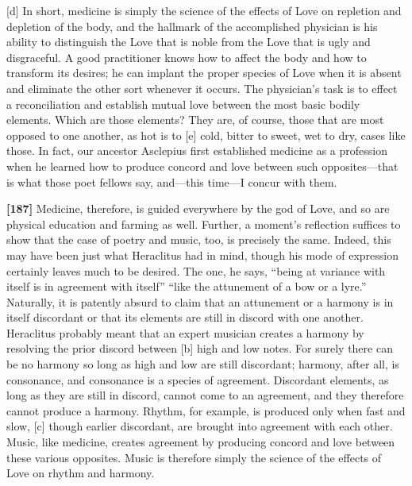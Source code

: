 {[}d{]} In short, medicine is simply the science of the effects of Love
on repletion and depletion of the body, and the hallmark of the
accomplished physician is his ability to distinguish the Love that is
noble from the Love that is ugly and disgraceful. A good practitioner
knows how to affect the body and how to transform its desires; he can
implant the proper species of Love when it is absent and eliminate the
other sort whenever it occurs. The physician's task is to effect a
reconciliation and establish mutual love between the most basic bodily
elements. Which are those elements? They are, of course, those that are
most opposed to one another, as hot is to {[}e{]} cold, bitter to sweet,
wet to dry, cases like those. In fact, our ancestor Asclepius first
established medicine as a profession when he learned how to produce
concord and love between such opposites---that is what those poet
fellows say, and---this time---I concur with them.

{\bf {[}187{]}} Medicine, therefore, is guided everywhere by the god of
Love, and so are physical education and farming as well. Further, a
moment's reflection suffices to show that the case of poetry and music,
too, is precisely the same. Indeed, this may have been just what
Heraclitus had in mind, though his mode of expression certainly leaves
much to be desired. The one, he says, “being at variance with itself is
in agreement with itself” “like the attunement of a bow or a
lyre.” Naturally, it
is patently absurd to claim that an attunement or a harmony is in itself
discordant or that its elements are still in discord with one another.
Heraclitus probably meant that an expert musician creates a harmony by
resolving the prior discord between {[}b{]} high and low notes. For
surely there can be no harmony so long as high and low are still
discordant; harmony, after all, is consonance, and consonance is a
species of agreement. Discordant elements, as long as they are still in
discord, cannot come to an agreement, and they therefore cannot produce
a harmony. Rhythm, for example, is produced only when fast and slow,
{[}c{]} though earlier discordant, are brought into agreement with each
other. Music, like medicine, creates agreement by producing concord and
love between these various opposites. Music is therefore simply the
science of the effects of Love on rhythm and harmony.

